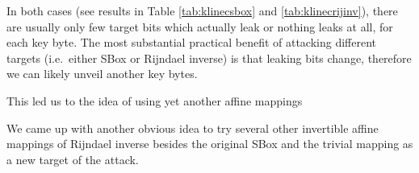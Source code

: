In both cases (see results in Table \ref{tab:klinecsbox} and \ref{tab:klinecrijinv}), there are usually only few target bits which actually leak or nothing leaks at all, for each key byte. The most substantial practical benefit of attacking different targets (i.e.\ either SBox or Rijndael inverse) is that leaking bits change, therefore we can likely unveil another key bytes.

This led us to the idea of using yet another affine mappings

We came up with another obvious idea to try several other invertible affine mappings of Rijndael inverse besides the original SBox and the trivial mapping as a new target of the attack.





